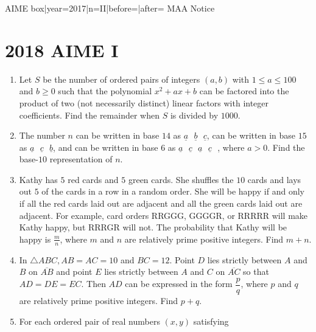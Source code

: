 \documentclass{article}
\begin{document}
\begin{enumerate}[label=\arabic*., itemsep=0.5em]
{{AIME box|year=2017|n=II|before=|after=}}
{{MAA Notice}}\par \vspace{0.5em}\end{enumerate}\newpage\section*{2018 AIME I}\begin{enumerate}[label=\arabic*., itemsep=0.5em]\item Let $S$ be the number of ordered pairs of integers $(a,b)$ with $1 \leq a \leq 100$ and $b \geq 0$ such that the polynomial $x^2+ax+b$ can be factored into the product of two (not necessarily distinct) linear factors with integer coefficients. Find the remainder when $S$ is divided by $1000$.\par \vspace{0.5em}\item The number $n$ can be written in base $14$ as $\underline{a}\text{ }\underline{b}\text{ }\underline{c}$, can be written in base $15$ as $\underline{a}\text{ }\underline{c}\text{ }\underline{b}$, and can be written in base $6$ as $\underline{a}\text{ }\underline{c}\text{ }\underline{a}\text{ }\underline{c}\text{ }$, where $a > 0$. Find the base-$10$ representation of $n$.\par \vspace{0.5em}\item Kathy has $5$ red cards and $5$ green cards. She shuffles the $10$ cards and lays out $5$ of the cards in a row in a random order. She will be happy if and only if all the red cards laid out are adjacent and all the green cards laid out are adjacent. For example, card orders RRGGG, GGGGR, or RRRRR will make Kathy happy, but RRRGR will not. The probability that Kathy will be happy is $ \frac{m}{n}$, where $m$ and $n$ are relatively prime positive integers. Find $m + n$.\par \vspace{0.5em}\item In $\triangle ABC, AB = AC = 10$ and $BC = 12$. Point $D$ lies strictly between $A$ and $B$ on $\overline{AB}$ and point $E$ lies strictly between $A$ and $C$ on $\overline{AC}$ so that $AD = DE = EC$. Then $AD$ can be expressed in the form $\dfrac{p}{q}$, where $p$ and $q$ are relatively prime positive integers. Find $p+q$.\par \vspace{0.5em}\item For each ordered pair of real numbers $(x,y)$ satisfying


\end{enumerate}
\end{document}
